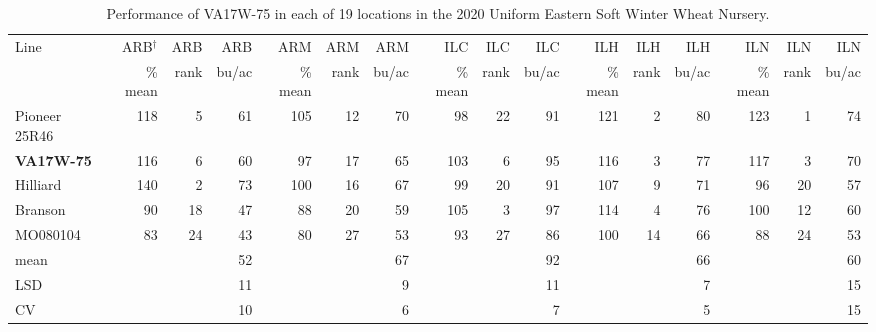 \documentclass[12pt, letterpaper]{article}
\begin{document}
\begin{landscape}
\newpage

\begin{table}
\scriptsize
\caption{Performance of VA17W-75 in each of 19 locations in the 2020 Uniform Eastern Soft Winter Wheat Nursery.}
\label{uenloc}

\begin{tabular}{|l|rrr|rrr|rrr|rrr|rrr|}
  \hline
Line & ARB$^\dagger$ & ARB & ARB & ARM & ARM & ARM & ILC & ILC & ILC & ILH & ILH & ILH & ILN & ILN & ILN \\ 
 & \% mean & rank & bu/ac & \% mean & rank & bu/ac & \% mean & rank & bu/ac & \% mean & rank & bu/ac & \% mean & rank & bu/ac \\ 
  \hline
Pioneer 25R46 & 118 &   5 &  61 & 105 &  12 &  70 &  98 &  22 &  91 & 121 &   2 &  80 & 123 &   1 &  74 \\ 
  \textbf{VA17W-75} & 116 &   6 &  60 &  97 &  17 &  65 & 103 &   6 &  95 & 116 &   3 &  77 & 117 &   3 &  70 \\ 
  Hilliard & 140 &   2 &  73 & 100 &  16 &  67 &  99 &  20 &  91 & 107 &   9 &  71 &  96 &  20 &  57 \\ 
  Branson &  90 &  18 &  47 &  88 &  20 &  59 & 105 &   3 &  97 & 114 &   4 &  76 & 100 &  12 &  60 \\ 
  MO080104 &  83 &  24 &  43 &  80 &  27 &  53 &  93 &  27 &  86 & 100 &  14 &  66 &  88 &  24 &  53 \\ 
  mean &  &  &  52 &  &  &  67 &  &  &  92 &  &  &  66 &  &  &  60 \\ 
  LSD &  &  &  11 &  &  &   9 &  &  &  11 &  &  &   7 &  &  &  15 \\ 
  CV &  &  &  10 &  &  &   6 &  &  &   7 &  &  &   5 &  &  &  15 \\ 
   \hline
\end{tabular}

\bigskip


\end{table}
\end{landscape}
\end{document}
